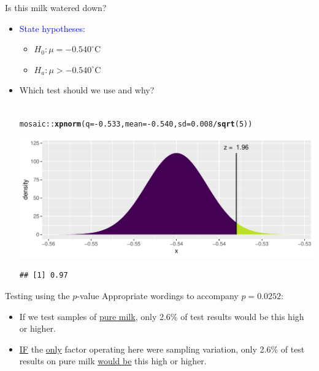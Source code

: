 \documentclass[10pt,handout]{beamer}\usepackage[]{graphicx}\usepackage[]{color}
\makeatletter
\def\maxwidth{ %
  \ifdim\Gin@nat@width>\linewidth
    \linewidth
  \else
    \Gin@nat@width
  \fi
}
\newcommand{\hlnum}[1]{\textcolor[rgb]{0.686,0.059,0.569}{#1}}%
\newcommand{\hlopt}[1]{\textcolor[rgb]{0,0,0}{#1}}%
\newcommand{\hlstd}[1]{\textcolor[rgb]{0.345,0.345,0.345}{#1}}%
\newcommand{\hlkwc}[1]{\textcolor[rgb]{0.333,0.667,0.333}{#1}}%
\newcommand{\hlkwd}[1]{\textcolor[rgb]{0.737,0.353,0.396}{\textbf{#1}}}%
\newenvironment{kframe}{%
 \def\at@end@of@kframe{}%
 \ifinner\ifhmode%
  \def\at@end@of@kframe{\end{minipage}}%
  \begin{minipage}{\columnwidth}%
 \fi\fi%
 \def\FrameCommand##1{\hskip\@totalleftmargin \hskip-\fboxsep
 \colorbox{shadecolor}{##1}\hskip-\fboxsep
     \hskip-\linewidth \hskip-\@totalleftmargin \hskip\columnwidth}%
 \MakeFramed {\advance\hsize-\width
   \@totalleftmargin\z@ \linewidth\hsize
   \@setminipage}}%
 {\par\unskip\endMakeFramed%
 \at@end@of@kframe}
\newenvironment{knitrout}{}{} %
\newcommand{\blue}[1]{\textcolor{blue}{#1}}
\makeatother
\begin{document}
\begin{frame}[fragile]{Is this milk watered down?}
	\begin{itemize}
		\setlength\itemsep{.7em}
		\item \blue{State hypotheses:} \pause \begin{itemize}
			\item $H_0: \mu =  -0.540^{\circ}$C \pause
			\item  $H_a: \mu >  -0.540^{\circ}$C
		\end{itemize}
		\item Which test should we use and why? \pause \\ \ \\
		
		
\begin{knitrout}\tiny
{}\color{fgcolor}\begin{kframe}
\begin{alltt}
\hlstd{mosaic}\hlopt{::}\hlkwd{xpnorm}\hlstd{(}\hlkwc{q} \hlstd{=} \hlopt{-}\hlnum{0.533}\hlstd{,} \hlkwc{mean} \hlstd{=} \hlopt{-}\hlnum{0.540}\hlstd{,} \hlkwc{sd} \hlstd{=} \hlnum{0.008}\hlopt{/}\hlkwd{sqrt}\hlstd{(}\hlnum{5}\hlstd{))}
\end{alltt}
\end{kframe}

{\centering \includegraphics[width=\maxwidth]{figure/unnamed-chunk-1-1} 

}


\begin{kframe}\begin{verbatim}
## [1] 0.97
\end{verbatim}
\end{kframe}
\end{knitrout}
		
	\end{itemize}
\end{frame}

\begin{frame}[fragile]{Testing using the $p$-value}
	Appropriate wordings to accompany $p=0.0252$:
	\begin{itemize}
		\setlength\itemsep{1.5em}
		\item If we test samples of \underline{pure milk}, only 2.6\% of test results would be this high or higher.
		\pause 
		\item \underline{IF} the \underline{only} factor operating here were sampling variation, only  2.6\% of test results on pure milk  \underline{would be} this high or higher.
	\end{itemize}
	
\end{frame}
\end{document}
